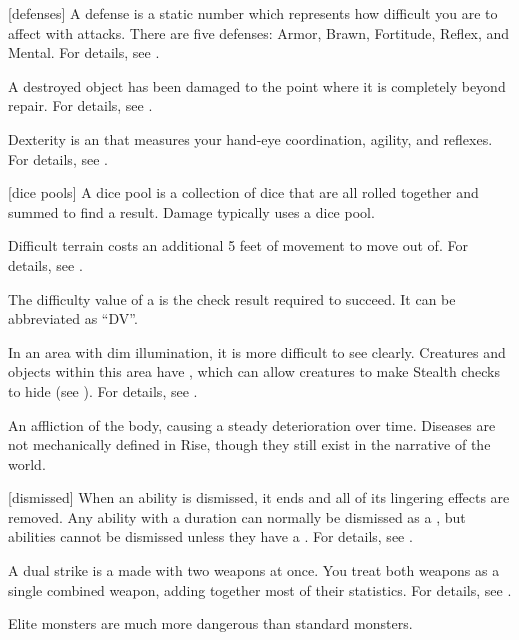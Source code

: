 [defenses] A defense is a static number which represents how difficult you are to affect with attacks.
There are five defenses: Armor, Brawn, Fortitude, Reflex, and Mental.
For details, see .

 A destroyed object has been damaged to the point where it is completely beyond repair.
For details, see .

 Dexterity is an  that measures your hand-eye coordination, agility, and reflexes.
For details, see .

[dice pools] A dice pool is a collection of dice that are all rolled together and summed to find a result.
Damage typically uses a dice pool.

 Difficult terrain costs an additional 5 feet of movement to move out of.
For details, see .

 The difficulty value of a  is the check result required to succeed.
It can be abbreviated as ``DV''.

 In an area with dim illumination, it is more difficult to see clearly.
Creatures and objects within this area have , which can allow creatures to make Stealth checks to hide (see ).
For details, see .

 An affliction of the body, causing a steady deterioration over time.
Diseases are not mechanically defined in Rise, though they still exist in the narrative of the world.

[dismissed] When an ability is dismissed, it ends and all of its lingering effects are removed.
Any \magical ability with a duration can normally be dismissed as a , but  abilities cannot be dismissed unless they have a .
For details, see .

 A dual strike is a  made with two weapons at once.
You treat both weapons as a single combined weapon, adding together most of their statistics.
For details, see .

 Elite monsters are much more dangerous than standard monsters.

